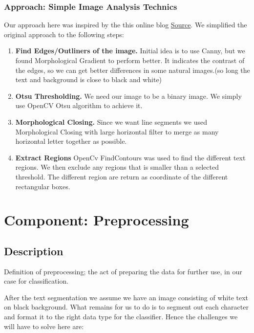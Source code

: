 \documentclass[Report.tex]{subfiles}
\begin{document}
\begin{flushleft}
  \subsubsection{Approach: Simple Image Analysis Technics}
  Our approach here was inspired by the this online blog \href{https://www.danvk.org/2015/01/07/finding-blocks-of-text-in-an-image-using-python-opencv-and-numpy.html}{Source}\cite{_finding_????}. We simplified the original approach to the following steps:
  \begin{enumerate}
    \item \textbf{Find Edges/Outliners of the image.}
    Initial idea is to use Canny, but we found Morphological Gradient to perform better. It indicates the contrast of the edges, so we can get better differences in some natural images.(so long the text and background is close to black and white)
    \item \textbf{Otsu Thresholding.}
    We need our image to be a binary image. We simply use OpenCV Otsu algorithm to achieve it.
    \item \textbf{Morphological Closing.}
    Since we want line segments we used Morphological Closing with large horizontal filter to merge as many horizontal letter together as possible.
    \item \textbf{Extract Regions}
    OpenCv FindContours was used to find the different text regions. We then exclude any regions that is smaller than a selected threshold. The different region are return as coordinate of the different rectangular boxes.
  \end{enumerate}
\end{flushleft}

\section{Component: Preprocessing}
\label{Method:Preprocessing}
\subsection{Description}
Definition of preprocessing; the act of preparing the data for further use,
in our case for classification. \par
After the text segmentation we assume we have an image consisting of white text on black background. What remains for us to do is to segment out each character and format it to the right data type for the classifier. Hence the challenges we will have to solve here are:
\end{document}
